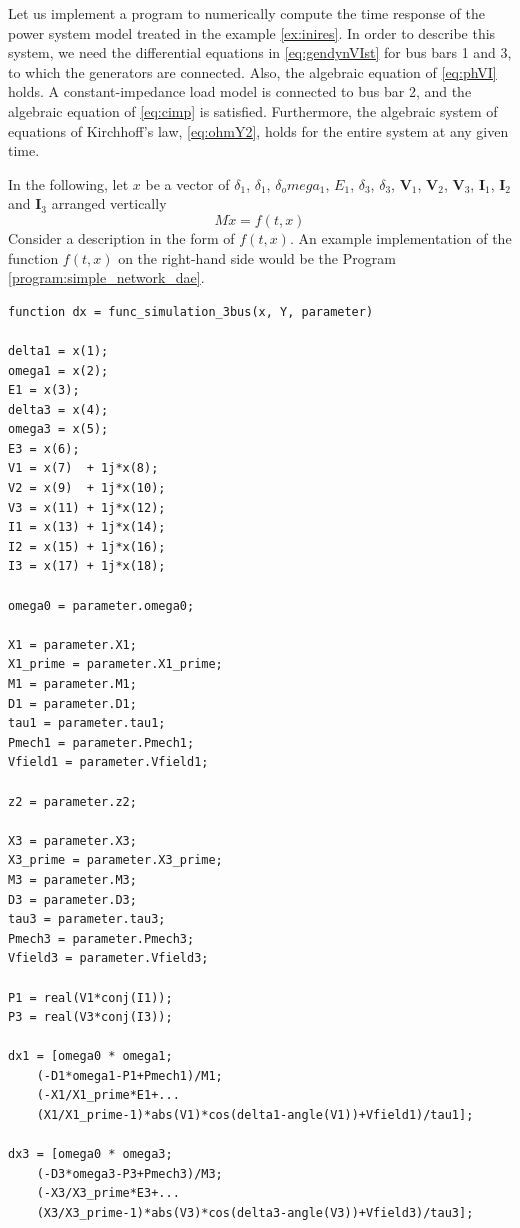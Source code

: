 \documentclass[graybox, envcountchap]{svmult}
\begin{document}
\begin{example}\label{ex:dae_ex2}
Let us implement a program to numerically compute the time response of the power system model treated in the example \ref{ex:inires}.
In order to describe this system, we need the differential equations in \ref{eq:gendynVIst} for bus bars 1 and 3, to which the generators are connected.
Also, the algebraic equation of \ref{eq:phVI} holds. A constant-impedance load model is connected to bus bar 2, and the algebraic equation of \ref{eq:cimp} is satisfied.
Furthermore, the algebraic system of equations of Kirchhoff's law, \ref{eq:ohmY2}, holds for the entire system at any given time.

In the following, let $x$ be a vector of $\delta_1$, $\delta_1$, $\delta_omega_1$, $E_1$, $\delta_3$, $\delta_3$, $\bm V_1$, $\bm V_2$, $\bm V_3$, $\bm I_1$, $\bm I_2$ and $\bm I_3$ arranged vertically
\[
M\dot{x} = f(t, x)
\]
Consider a description in the form of $f(t, x)$.
An example implementation of the function $f(t, x)$ on the right-hand side would be the Program \ref{program:simple_network_dae}.

\smallskip
\begin{PROGRAMA}[count,title={func\_simulation\_3bus.m}]\label{program:simple_network_dae}
\begin{verbatim}
function dx = func_simulation_3bus(x, Y, parameter)

delta1 = x(1);
omega1 = x(2);
E1 = x(3);
delta3 = x(4);
omega3 = x(5);
E3 = x(6);
V1 = x(7)  + 1j*x(8);
V2 = x(9)  + 1j*x(10);
V3 = x(11) + 1j*x(12);
I1 = x(13) + 1j*x(14);
I2 = x(15) + 1j*x(16);
I3 = x(17) + 1j*x(18);

omega0 = parameter.omega0;

X1 = parameter.X1;
X1_prime = parameter.X1_prime;
M1 = parameter.M1;
D1 = parameter.D1;
tau1 = parameter.tau1;
Pmech1 = parameter.Pmech1;
Vfield1 = parameter.Vfield1;

z2 = parameter.z2;

X3 = parameter.X3;
X3_prime = parameter.X3_prime;
M3 = parameter.M3;
D3 = parameter.D3;
tau3 = parameter.tau3;
Pmech3 = parameter.Pmech3;
Vfield3 = parameter.Vfield3;

P1 = real(V1*conj(I1));
P3 = real(V3*conj(I3));

dx1 = [omega0 * omega1;
    (-D1*omega1-P1+Pmech1)/M1;
    (-X1/X1_prime*E1+...
    (X1/X1_prime-1)*abs(V1)*cos(delta1-angle(V1))+Vfield1)/tau1];

dx3 = [omega0 * omega3;
    (-D3*omega3-P3+Pmech3)/M3;
    (-X3/X3_prime*E3+...
    (X3/X3_prime-1)*abs(V3)*cos(delta3-angle(V3))+Vfield3)/tau3];


\end{verbatim}
\end{PROGRAMA}
\end{example}
\end{document}
